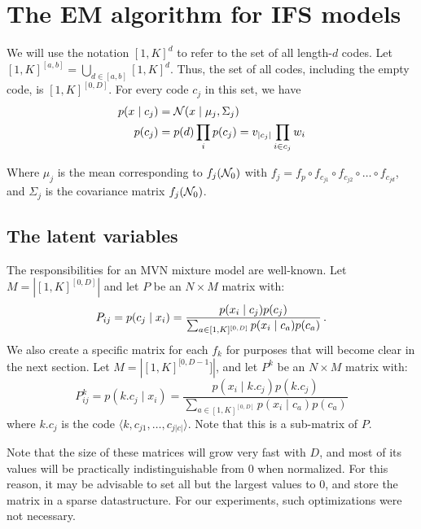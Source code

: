 \documentclass[10pt,a4paper,oneside]{article}
\theoremstyle{definition}
\newcommand{\p}{\mbox{\,.}}
\newcommand{\cN}{{\cal N}}
\theoremstyle{definition}
\begin{document}

\section{The EM algorithm for IFS models}

We will use the notation $[1,K]^d$ to refer to the set of all length-$d$ codes. Let $[1,K]^{[a,b]} = \bigcup_{d \in [a,b]} [1,K]^d$. Thus, the set of all codes, including the empty code, is $[1, K]^{[0, D]}$. For every code $c_j$ in this set, we have 
\begin{align*} 
p(x \mid c_j) &= \cN(x \mid \mu_j, \Sigma_j) \\
p(c_j) &= p(d) \prod_i p(c_j) = v_{|c_j|}\prod_{i \in c_j} w_{i}
\end{align*}

Where $\mu_j$ is the mean corresponding to $f_j(\cN_0)$ with $f_j = f_p \circ f_{c_{j1}} \circ f_{c_{j2}} \circ \ldots \circ f_{c_{jd}}$, and $\Sigma_j$ is the covariance matrix $f_j(\cN_0)$.

\subsection{The latent variables}

The responsibilities for an MVN mixture model are well-known. Let $M = |[1, K]^{[0, D]}|$ and let $P$ be an $N\times M$ matrix with: 
\[
P_{ij} = p(c_j \mid x_i) = \frac{p(x_i\mid c_j) p(c_j) }{\sum_{a \in [1,K]^{[0, D]}} p(x_i\mid c_a) p(c_a)} \p 
\]
We also create a specific matrix for each $f_k$ for purposes that will become clear in the next section. Let $M = |[1, K]^{[0, D-1}]|$, and let $P^k$ be an $N \times M$ matrix with: 
\[
P_{ij}^k = p(k.c_j \mid x_i) = \frac{p(x_i\mid k.c_j) p(k.c_j) }{\sum_{a \in [1,K]^{[0, D]}} p(x_i\mid c_a) p(c_a)} 
\]
where $k.c_j$ is the code $\langle k, c_{j1}, \ldots, c_{j|c|}\rangle$. Note that this is a sub-matrix of $P$.

Note that the size of these matrices will grow very fast with $D$, and most of its values will be practically indistinguishable from $0$ when normalized. For this reason, it may be advisable to set all but the largest values to $0$, and store the matrix in a sparse datastructure. For our experiments, such optimizations were not necessary.
\end{document}

